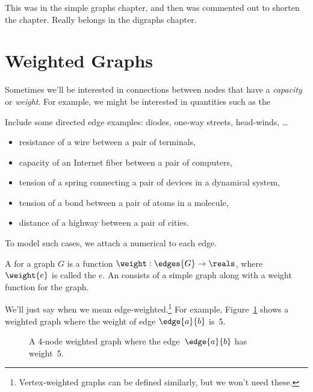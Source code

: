 \begin{editingnotes}
This was in the simple graphs chapter, and then was commented out to
shorten the chapter.  Really belongs in the digraphs chapter.
\end{editingnotes}

\section{Weighted Graphs}

Sometimes we'll be interested in connections between nodes that have a
\emph{capacity} or \emph{weight}.  For example, we might be interested in
quantities such as the
\begin{editingnotes}
Include some directed edge examples: diodes, one-way streets, head-winds, \dots
\end{editingnotes}
\begin{itemize}

\item resistance of a wire between a pair of terminals, 

\item capacity of an Internet fiber between a pair of computers,

\item tension of a spring connecting a pair of devices in a dynamical system,

\item tension of a bond between a pair of atoms in a molecule,

\item distance of a highway between a pair of cities.

\end{itemize}
To model such cases, we attach a numerical  to each edge.
\begin{definition}
  A  for a graph $G$ is a function $\weight: \edges{G} \to
  \reals$, where $\weight{e}$ is called the  $e$.
An  consists of a simple graph along with
a weight function for the graph.
\end{definition}
We'll just say  when we mean
edge-weighted.\footnote{Vertex-weighted graphs can be defined similarly,
  but we won't need these.}
For example, Figure~\ref{fig:weighted_graph} shows a weighted graph
where the weight of edge $\edge{a}{b}$ is~5.

\begin{figure}


\caption{A 4-node weighted graph where the edge~$\edge{a}{b}$ has
  weight~5.}
\label{fig:weighted_graph}
\end{figure}

